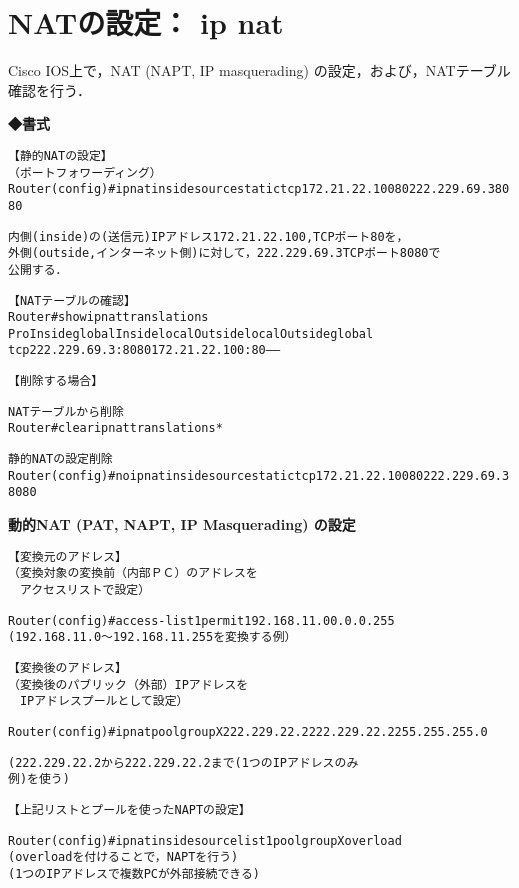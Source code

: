 \section{NATの設定： ip nat}
\label{cmd:ios-ip-nat}
Cisco IOS上で，NAT (NAPT, IP masquerading) の設定，および，NATテーブル確認を行う．

\noindent
{\bf ◆書式}
\begin{center}
\begin{screen}
\begin{alltt}
【静的 NAT の設定】
（ポートフォワーディング）
Router(config)#ip nat inside source static tcp 172.21.22.100 80 222.229.69.3 8080

内側(inside) の(送信元)IPアドレス 172.21.22.100, TCP ポート 80 を，
外側(outside, インターネット側) に対して，222.229.69.3 TCP ポート 8080 で
公開する．

【NATテーブルの確認】
Router#show ip nat translations
Pro Inside global         Inside local          Outside local         Outside global
tcp 222.229.69.3:8080     172.21.22.100:80      ---                   ---

【削除する場合】

NATテーブルから削除
Router#clear ip nat translations *

静的 NAT の設定削除
Router(config)#no ip nat inside source static tcp 172.21.22.100 80 222.229.69.3 8080
\end{alltt}
\end{screen}
\end{center}

\textbf{動的NAT (PAT, NAPT, IP Masquerading) の設定}

\begin{center}
\begin{screen}
\begin{alltt}

【変換元のアドレス】
（変換対象の変換前（内部ＰＣ）のアドレスを
　アクセスリストで設定）

Router(config)# access-list 1 permit 192.168.11.0 0.0.0.255
(192.168.11.0～192.168.11.255を変換する例）

【変換後のアドレス】
（変換後のパブリック（外部）IPアドレスを
　IPアドレスプールとして設定）

Router(config)# ip nat pool groupX 222.229.22.2 222.229.22.2 255.255.255.0

(222.229.22.2から222.229.22.2まで(1つのIPアドレスのみ
例)を使う)

【上記リストとプールを使ったNAPTの設定】

Router(config)# ip nat inside source list 1 pool groupX overload
(overloadを付けることで，NAPTを行う)
(1つのIPアドレスで複数PCが外部接続できる)
\end{alltt}
\end{screen}
\end{center}

